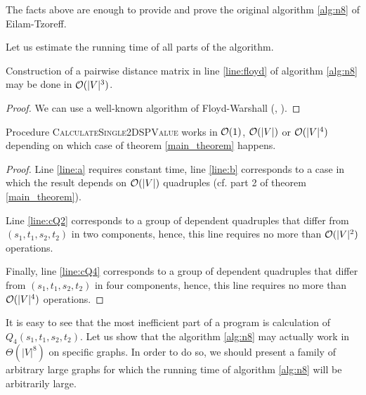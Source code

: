 The facts above are enough to provide and prove the original algorithm \ref{alg:n8} of Eilam-Tzoreff.

Let us estimate the running time of all parts of the algorithm.

\begin{proposition}
Construction of a pairwise distance matrix in line \ref{line:floyd} of algorithm \ref{alg:n8} may be done in $\mathcal{O}(|V|^3)$.
\end{proposition}
\begin{proof}
We can use a well-known algorithm of Floyd-Warshall (\cite{Floyd}, \cite{CLRS}).
\end{proof}

\begin{proposition}
Procedure \textsc{CalculateSingle2DSPValue} works in $\mathcal{O}(1)$, $\mathcal{O}(|V|)$ or $\mathcal{O}(|V|^4)$ depending on which case of theorem \ref{main_theorem} happens.
\end{proposition}
\begin{proof}
Line \ref{line:a} requires constant time, line \ref{line:b} corresponds to a case in which the result depends on $\mathcal{O}(|V|)$ quadruples (cf. part 2 of theorem \ref{main_theorem}). 

Line \ref{line:cQ2} corresponds to a group of dependent quadruples that differ from $(s_1, t_1, s_2, t_2)$ in two components, hence, this line requires no more than $\mathcal{O}(|V|^2)$ operations.

Finally, line \ref{line:cQ4} corresponds to a group of dependent quadruples that differ from $(s_1, t_1, s_2, t_2)$ in four components, hence, this line requires no more than $\mathcal{O}(|V|^4)$ operations. \end{proof}

It is easy to see that the most inefficient part of a program is calculation of $Q_4(s_1, t_1, s_2, t_2)$. Let us show that the algorithm \ref{alg:n8} may actually work in $\Theta(|V|^8)$ on specific graphs. In order to do so, we should present a family of arbitrary large graphs for which the running time of algorithm \ref{alg:n8} will be arbitrarily large. 

